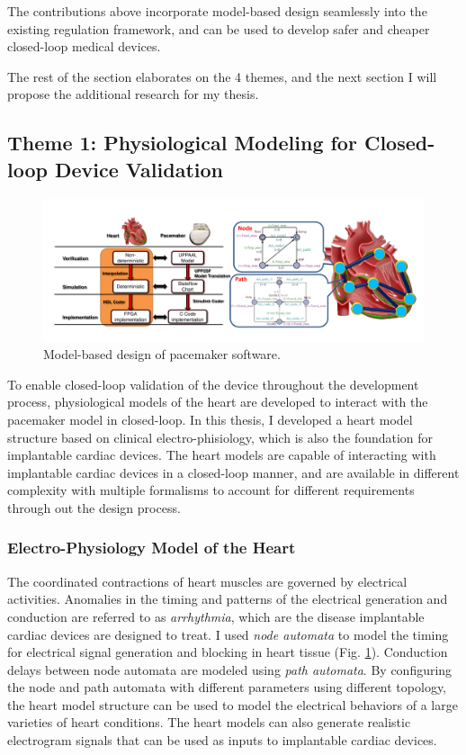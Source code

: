 \documentclass[a4paper]{article}
\begin{document}
The contributions above incorporate model-based design seamlessly into the existing regulation framework, and can be used to develop safer and cheaper closed-loop medical devices. 

The rest of the section elaborates on the 4 themes, and the next section I will propose the additional research for my thesis.
\newpage
\subsection{Theme 1: Physiological Modeling for Closed-loop Device Validation}
\begin{figure}[t]
	\centering
	\includegraphics[scale=0.32]{figs/mb_heart.pdf}
	\caption{\small Model-based design of pacemaker software.}
	\label{fig:mb_heart}
\end{figure}
To enable closed-loop validation of the device throughout the development process, physiological models of the heart are developed to interact with the pacemaker model in closed-loop. 
In this thesis, I developed a heart model structure based on clinical electro-phisiology, which is also the foundation for implantable cardiac devices.
The heart models are capable of interacting with implantable cardiac devices in a closed-loop manner, and are available in different complexity with multiple formalisms to account for different requirements through out the design process.
\subsubsection{Electro-Physiology Model of the Heart}
The coordinated contractions of heart muscles are governed by electrical activities.
Anomalies in the timing and patterns of the electrical generation and conduction are referred to as \emph{arrhythmia}, which are the disease implantable cardiac devices are designed to treat.
I used \emph{node automata} to model the timing for electrical signal generation and blocking in heart tissue (Fig. \ref{fig:mb_heart}).
Conduction delays between node automata are modeled using \emph{path automata}.
By configuring the node and path automata with different parameters using different topology, the heart model structure can be used to model the electrical behaviors of a large varieties of heart conditions. 
The heart models can also generate realistic electrogram signals that can be used as inputs to implantable cardiac devices.
\end{document}
